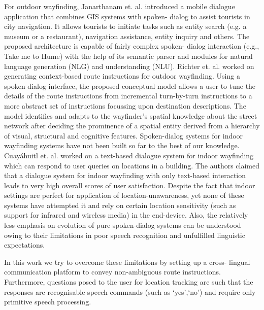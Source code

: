 \documentclass{iitkthesis}
\begin{document}
For outdoor wayfinding, Janarthanam et. al. \cite{janarthanam} introduced 
a mobile dialogue application that combines GIS systems with spoken-
dialog to assist tourists in city navigation. It allows 
tourists to initiate tasks such as entity search (e.g. a museum or a 
restaurant), navigation assistance, entity inquiry and others. The 
proposed architecture is capable of fairly complex spoken-
dialog interaction (e.g., Take me to Hume) with the help of its semantic 
parser and  modules for natural language generation (NLG) and 
understanding (NLU). Richter et. al. \cite{richter} worked on generating 
context-based route instructions for outdoor wayfinding. Using a spoken 
dialog interface, the proposed conceptual model allows a user to tune the 
details of the route instructions from incremental turn-by-turn 
instructions to a more abstract set of instructions focussing upon 
destination descriptions. The model identifies and adapts to the wayfinder's 
spatial knowledge about the street network after deciding the prominence 
of a spatial entity derived from a hierarchy of visual, structural and 
cognitive features. Spoken-dialog systems for indoor wayfinding systems 
have not been built so far to the best of our knowledge. Cuay\'{a}huitl 
et. al.  \cite{heriberto} worked on a text-based dialogue system for indoor 
wayfinding which can respond to user queries on locations in a building. 
The authors claimed that a dialogue system for indoor wayfinding with 
only text-based interaction leads to very high overall scores of user 
satisfaction. Despite the fact that indoor settings are perfect for 
application of location-unawareness, yet none of these systems have  
attempted it and rely on certain location sensitivity (such as support 
for infrared and wireless media) in the end-device. Also, the relatively 
less emphasis on evolution of pure spoken-dialog systems can be 
understood owing to their limitations in poor speech recognition and 
unfulfilled linguistic expectations. 

In this work we try to overcome these limitations by setting up a cross-
lingual communication platform to convey non-ambiguous route instructions.
Furthermore, questions posed to the user for location tracking are 
such that the responses are recognisable speech commands 
(such as `yes',`no') and require only primitive speech processing. 
\end{document}
